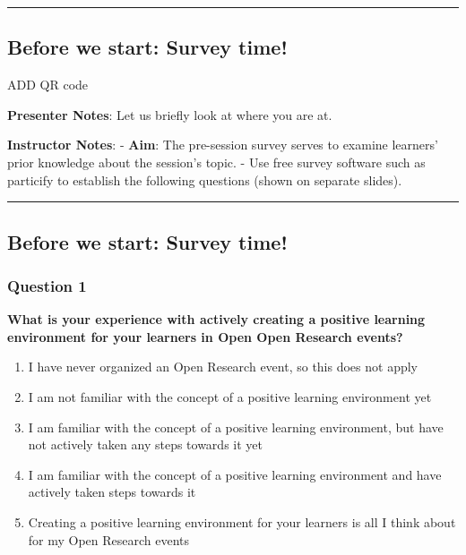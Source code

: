 \documentclass[
  letterpaper,
  DIV=11,
  numbers=noendperiod]{scrartcl}
\begin{document}
\begin{center}\rule{0.5\linewidth}{0.5pt}\end{center}

\subsection{Before we start: Survey
time!}\label{before-we-start-survey-time}

ADD QR code

\textbf{Presenter Notes}: Let us briefly look at where you are at.

\textbf{Instructor Notes}: - \textbf{Aim}: The pre-session survey serves
to examine learners' prior knowledge about the session's topic. - Use
free survey software such as particify to establish the following
questions (shown on separate slides).

\begin{center}\rule{0.5\linewidth}{0.5pt}\end{center}

\subsection{Before we start: Survey
time!}\label{before-we-start-survey-time-1}

\subsubsection{Question 1}

\textbf{What is your experience with actively creating a positive
learning environment for your learners in Open Open Research events?}

\begin{enumerate}
\def\labelenumi{\alph{enumi}.}
\item
  I have never organized an Open Research event, so this does not apply
\item
  I am not familiar with the concept of a positive learning environment
  yet
\item
  I am familiar with the concept of a positive learning environment, but
  have not actively taken any steps towards it yet
\item
  I am familiar with the concept of a positive learning environment and
  have actively taken steps towards it
\item
  Creating a positive learning environment for your learners is all I
  think about for my Open Research events
\end{enumerate}
\end{document}

